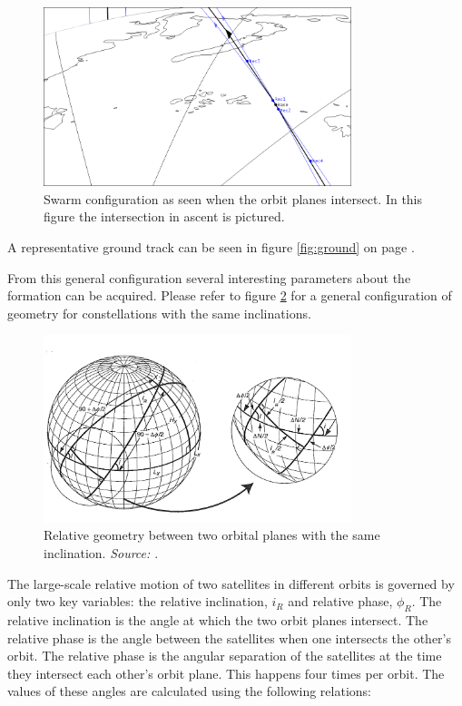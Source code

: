 \begin{figure}[!h]
\centering
\includegraphics[width=0.8\textwidth, angle=0]{chapters/img/primaryconfmin.png}
\caption{Swarm configuration as seen when the orbit planes intersect. In this figure the intersection in ascent is pictured.}
\label{fig:confmin}
\end{figure}

A representative ground track can be seen in figure \ref{fig:ground} on page \pageref{fig:ground}.

From this general configuration several interesting parameters about the formation can be acquired. Please refer to figure \ref{fig:constgeo} for a general configuration of geometry for constellations with the same inclinations.

\begin{figure}[!h]
\centering
\includegraphics[width=0.8\textwidth, angle=0]{chapters/img/intersectionPhase.png}
\caption{Relative geometry between two orbital planes with the same inclination. \emph{Source: \cite{constDesign}}.}
\label{fig:constgeo}
\end{figure}

The large-scale relative motion of two satellites in different orbits is governed by only two key variables: the relative inclination, $i_R$ and relative phase, $\phi_R$. The relative inclination is the angle at which the two orbit planes intersect. The relative phase is the angle between the satellites when one intersects the other's orbit. The relative phase is the angular separation of the satellites at the time they intersect each other's orbit plane. This happens four times per orbit. The values of these angles are calculated using the following relations:

